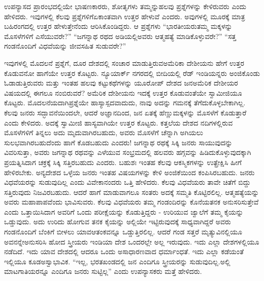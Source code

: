 ಉಪನ್ಯಾಸದ ಪ್ರಾರಂಭದಲ್ಲಿಯೇ ಭಾಷಣಕಾರರು, ಶೋತೃಗಳು ತಮ್ಮನ್ನು\break ಹಲವು ಪ್ರಶ್ನೆಗಳನ್ನು ಕೇಳಿರುವರು ಎಂದು ಹೇಳಿದರು. ಇವುಗಳಲ್ಲಿ ಕೆಲವು ಪ್ರಶ್ನೆಗಳಿಗೆ\break ಏಕಾಂತವಾಗಿ ಉತ್ತರ ಹೇಳುವೆ ಎಂದರು. ಅವುಗಳಲ್ಲಿ ಮೂರಕ್ಕೆ ಮಾತ್ರ ಬಹಿರಂಗದಲ್ಲಿ ಉತ್ತರ ಹೇಳುತ್ತೇನೆಂದು ಆರಿಸಿಕೊಂಡಿದ್ದರು. ಆ ಪ್ರಶ್ನೆಗಳು “ಭಾರತೀಯರು\break ತಮ್ಮ ಮಕ್ಕಳನ್ನು ಮೊಸಳೆಗಳಿಗೆ ಎಸೆಯುವರೇ?” “ಜಗನ್ನಾಥ ರಥದ ಅಡಿಯಲ್ಲಿ\break ಅವರು ಆತ್ಮಹತ್ಯೆ ಮಾಡಿಕೊಳ್ಳುವರೇ?” “ಸತ್ತ ಗಂಡನೊಂದಿಗೆ ವಿಧವೆಯನ್ನು ಜೀವಸಹಿತ ಸುಡುವರೇ?”

ಇವುಗಳಲ್ಲಿ ಮೊದಲನೆ ಪ್ರಶ್ನೆಗೆ, ದೂರ ದೇಶದಲ್ಲಿ ಸಂಚಾರ ಮಾಡುತ್ತಿರುವ\break ಅಮೆರಿಕಾ ದೇಶೀಯನು ಹೇಗೆ ಉತ್ತರ ಕೊಡುವನೋ ಹಾಗೆಯೇ ಉತ್ತರ ಕೊಟ್ಟರು. ನ್ಯೂಯಾರ್ಕ್​ ನಗರದಲ್ಲಿ ಬೀದಿಯಲ್ಲಿ ರೆಡ್​ ಇಂಡಿಯನ್ನರು ಅಂಜಿಕೊಂಡು ಓಡಾಡು\-ತ್ತಿರುವರು ಮತ್ತು ಇಂತಹ ಹಲವು ಕಟ್ಟುಕಥೆಗಳನ್ನು ಯೂರೋಪ್​ ದೇಶದ ಜನ\break ಅಮೆರಿಕ ದೇಶೀಯರ ವಿಷಯದಲ್ಲಿ ಈಗಲೂ ನಂಬಿರುವರೆ? ಅಮೆರಿಕ ದೇಶೀಯನು ಇದಕ್ಕೆ ಉತ್ತರ ಕೊಡುವಂತೆಯೇ ಸ್ವಾಮೀಜಿಯೂ ಕೊಟ್ಟರು. ಮೊದಲನೆಯದಾಗಿ\break ಪ್ರಶ್ನೆಯೇ ಹಾಸ್ಯಾಸ್ಪದವಾದುದು, ನಾವು ಅದನ್ನು ಗಮನಕ್ಕೆ ತೆಗೆದುಕೊಳ್ಳಬೇಕಾಗಿಲ್ಲ. ಕೆಲವು ಜನರು ಸದ್ಭಾವನೆಯಿಂದಲೇ, ಆದರೆ ಅಜ್ಞಾನದಿಂದ, ಜನ ಏತಕ್ಕೆ ಹೆಣ್ಣುಮಕ್ಕಳನ್ನು ಮೊಸಳೆಗೆ ಕೊಡುತ್ತಾರೆ ಎಂದು ಕೇಳಿದರು. ಅದಕ್ಕೆ ಸ್ವಾಮೀಜಿ ಹಾಸ್ಯವಾಗಿಯೇ ಉತ್ತರ ಕೊಟ್ಟರು. ಕತ್ತಲೆಯ ದೇಶದ ನದಿಗಳಲ್ಲಿರುವ ಮೊಸಳೆಗಳಿಗೆ ತಿನ್ನಲು ಅದು ಮೃದುವಾಗಿರಬಹುದು, ಅವರು ಮೊಸಳೆಗೆ ಚೆನ್ನಾಗಿ ಅಗಿಯಲು ಸುಲಭವಾಗಿರಬಹುದೆಂದು ಹಾಗೆ ಕೊಡಬಹುದು ಎಂದರು! ಜಗನ್ನಾಥ ರಥಕ್ಕೆ ಸಿಕ್ಕಿ ಜನರು ಸಾಯುವುದನ್ನು ವಿವರಿಸುತ್ತಾ, ಅವರು ಜಗನ್ನಾಥ ರಥವನ್ನು ಎಳೆಯುವ ಸಂಭ್ರಮದಲ್ಲಿ ಹಲವರು ಹಗ್ಗವನ್ನು ಹಿಡಿದುಕೊಳ್ಳುವುದಕ್ಕಾಗಿ ಪ್ರಯತ್ನಿಸಿದಾಗ ಚಕ್ರಕ್ಕೆ ಸಿಕ್ಕಿ ಸತ್ತಿರಬಹುದು ಎಂದರು. ಬಹುಶಃ ಇಂತಹ ಕೆಲವು ಆಕಸ್ಮಿಕಗಳನ್ನು ಉತ್ಪ್ರೇಕ್ಷಿಸಿ ಹೀಗೆ ಹೇಳಿರಬೇಕು. ಅನ್ಯದೇಶದ ಒಳ್ಳೆಯ ಜನರು ಇಂತಹ ವಿಷಯಗಳನ್ನು ಕೇಳಿ ಅಂಜಿಕೆಯಿಂದ ಕಂಪಿಸಿರಬಹುದು. ಜನರು ವಿಧವೆಯರನ್ನು ಸುಡುವುದಿಲ್ಲ ಎಂದು ವಿವೇಕಾನಂದರು ಒತ್ತಿ ಹೇಳಿದರು. ಕೆಲವು ವಿಧವೆಯರು ತಾವೇ ಚಿತೆಗೆ ಬಿದ್ದು ಸತ್ತಿರುವುದು ನಿಜವಿರಬಹುದು. ಆದರೆ ಹಾಗೆ ಮಾಡುವಾಗಲೂ ಸಂತರು ಅದಕ್ಕೆ ಸಮ್ಮತಿ ಕೊಟ್ಟಿರಲಿಲ್ಲ. ಆತ್ಮಹತ್ಯೆಯನ್ನು ಅವರು ಮಹಾಪಾಪವೆಂದು ಭಾವಿಸುವರು. ಕೆಲವು ವಿಧವೆಯರು ತಮ್ಮ ಗಂಡಂದಿರನ್ನು ಕೊನೆಯತನಕ ಅನುಸರಿಸುತ್ತೇವೆ ಎಂದು ಒತ್ತಾಯಿಸಿದಾಗ ಅವರಿಗೆ ಒಂದು ಪರೀಕ್ಷೆಯನ್ನು ಕೊಡುತ್ತಿದ್ದರು - ಉರಿಯುವ ಜ್ವಾಲೆಗೆ ತಮ್ಮ ಕೈಯನ್ನು ಒಡ್ಡುವುದು. ಅದು ಉರಿದು ಹೋಗುವ ತನಕ ಕೈಯನ್ನು ಅಲ್ಲಿಯೇ ಇಟ್ಟಿರುವುದಕ್ಕೆ ಸಾಧ್ಯವಾಗಿದ್ದರೆ ಅವರು ಗಂಡನೊಂದಿಗೆ ಬೆಂಕಿಗೆ ಬೀಳಲು ಯಾವ\break ಆತಂಕವನ್ನೂ ಒಡ್ಡುತ್ತಿರಲಿಲ್ಲ. ಆದರೆ ಗಂಡ ಸತ್ತರೆ ಮೃತ್ಯುವಿನಲ್ಲಿಯೂ ಅವನನ್ನೇ\break ಅನುಸರಿಸಿ ಹೋದ ಸ್ತ್ರೀಯರು ಇಂಡಿಯಾ ದೇಶ ಒಂದರಲ್ಲೇ ಅಲ್ಲ ಇರುವುದು. ಇದು ಎಲ್ಲಾ ದೇಶಗಳಲ್ಲಿಯೂ ನಡೆದಿದೆ. ಇದು ಯಾವ ದೇಶದಲ್ಲಿ ಆದರೂ ಒಂದು ಅಸಾಧಾರಣವಾದ ಧರ್ಮಾಂಧತೆ. ಇದು ಎಲ್ಲಾ ಕಡೆಯಂತೆ ಇಲ್ಲಿಯೂ ಕೂಡ\break ಅಸ್ವಾಭಾವಿಕ. “ಇಲ್ಲ, ಭರತಖಂಡದಲ್ಲಿ ಜನ ಎಂದಿಗೂ ಸ್ತ್ರೀಯರನ್ನು ಸುಡುವುದಿಲ್ಲ.\break ಅಲ್ಲಿ ಮಾಟಗಾತಿಯರನ್ನೂ ಎಂದಿಗೂ ಜನರು ಸುಟ್ಟಿಲ್ಲ” ಎಂದು ಉಪನ್ಯಾಸಕರು ಮತ್ತೆ ಹೇಳಿದರು.

